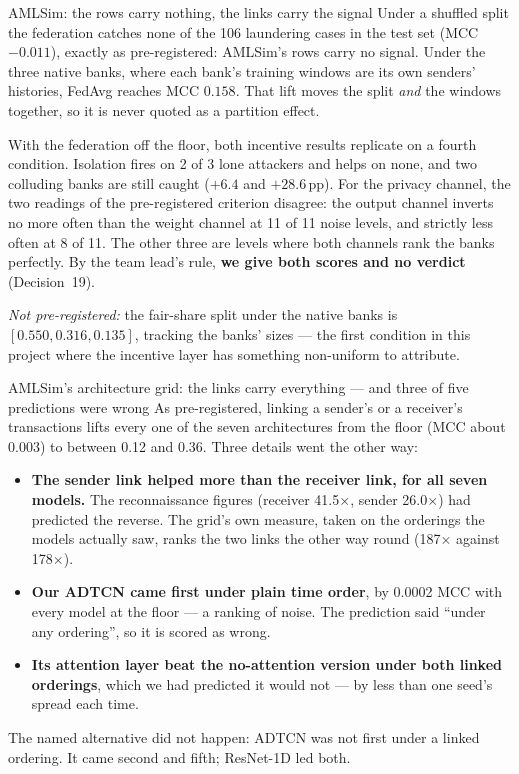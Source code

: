 \documentclass[11pt]{article}
\newcommand{\x}{\ensuremath{\times}}
\begin{document}
\begin{keybox}{AMLSim: the rows carry nothing, the links carry the signal}
Under a shuffled split the federation catches none of the 106 laundering cases in the test set (MCC
$-0.011$), exactly as pre-registered: AMLSim's rows carry no signal. Under the three native banks, where
each bank's training windows are its own senders' histories, FedAvg reaches MCC $0.158$. That lift moves
the split \emph{and} the windows together, so it is never quoted as a partition effect.

With the federation off the floor, both incentive results replicate on a fourth condition. Isolation fires
on 2 of 3 lone attackers and helps on none, and two colluding banks are still caught ($+6.4$ and
$+28.6$\,pp). For the privacy channel, the two readings of the pre-registered criterion disagree: the
output channel inverts no more often than the weight channel at 11 of 11 noise levels, and strictly less
often at 8 of 11. The other three are levels where both channels rank the banks perfectly. By the team
lead's rule, \textbf{we give both scores and no verdict} (Decision~19).

\emph{Not pre-registered:} the fair-share split under the native banks is $[0.550, 0.316, 0.135]$,
tracking the banks' sizes --- the first condition in this project where the incentive layer has something
non-uniform to attribute.
\end{keybox}

\begin{warnbox}{AMLSim's architecture grid: the links carry everything --- and three of five predictions were wrong}
As pre-registered, linking a sender's or a receiver's transactions lifts every one of the seven
architectures from the floor (MCC about 0.003) to between 0.12 and 0.36. Three details went the other way:
\begin{itemize}
  \item \textbf{The sender link helped more than the receiver link, for all seven models.} The
  reconnaissance figures (receiver 41.5\x, sender 26.0\x) had predicted the reverse. The grid's own
  measure, taken on the orderings the models actually saw, ranks the two links the other way round
  (187\x{} against 178\x).
  \item \textbf{Our ADTCN came first under plain time order}, by 0.0002 MCC with every model at the
  floor --- a ranking of noise. The prediction said ``under any ordering'', so it is scored as wrong.
  \item \textbf{Its attention layer beat the no-attention version under both linked orderings}, which we
  had predicted it would not --- by less than one seed's spread each time.
\end{itemize}
The named alternative did not happen: ADTCN was not first under a linked ordering. It came second and
fifth; ResNet-1D led both.
\end{warnbox}
\end{document}
